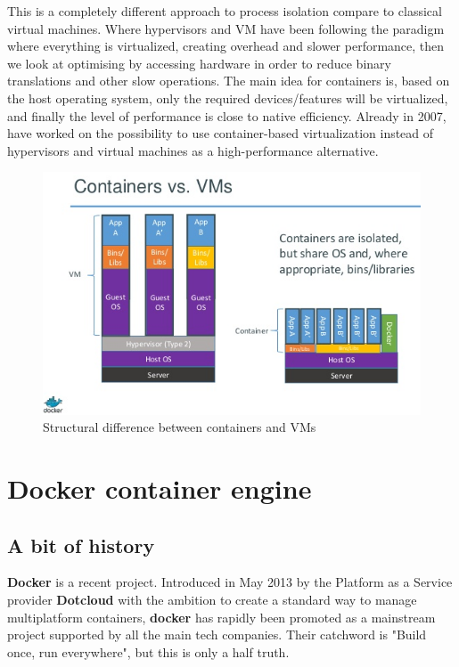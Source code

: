 This is a completely different approach to process isolation compare to
classical virtual machines. Where hypervisors and VM have been following the
paradigm where everything is virtualized, creating overhead and slower
performance, then we look at optimising by accessing hardware in order to
reduce binary translations and other slow operations. The main idea for
containers is, based on the host operating system, only the required
devices/features will be virtualized, and finally the level of performance is
close to native efficiency. Already in 2007, \cite{containersAsAlternative}
have worked on the possibility to use container-based virtualization instead of
hypervisors and virtual machines as a high-performance alternative.

\begin{figure}
	\includegraphics[width=\textwidth]{./Images/containers_vs_vms.png}
	\caption{Structural difference between containers and VMs}
\end{figure}

\section{Docker container engine}

\subsection{A bit of history}

\textbf{Docker} is a recent project. Introduced in May 2013 by the Platform as
a Service provider \textbf{Dotcloud} with the ambition to create a standard way
to manage multiplatform containers, \textbf{docker} has rapidly been promoted
as a mainstream project supported by all the main tech companies.  Their
catchword is "Build once, run everywhere", but this is only a half truth.

